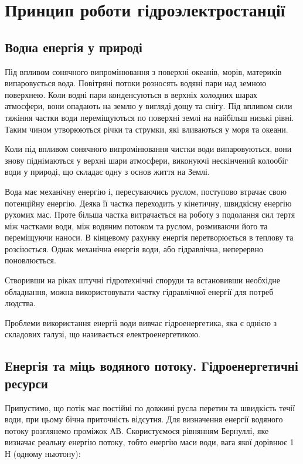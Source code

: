 \documentclass[12pt]{article}
\numberwithin{equation}{section}
\numberwithin{figure}{section}
\begin{document}
\newpage

\section{Принцип роботи гідроэлектростанції}

\subsection{Водна енергія у природі}

Під впливом сонячного випромінювання з поверхні океанів, морів, материків випаровується вода. Повітряні потоки розносять водяні пари над земною поверхнею. Коли водні пари конденсуються в верхніх холодних шарах атмосфери, вони опадають на землю у вигляді дощу та снігу. Під впливом сили тяжіння частки води переміщуються по поверхні землі на найбільш низькі рівні. Таким чином утворюються річки та струмки, які вливаються у моря та океани. 

Коли під впливом сонячного випромінювання чистки води випаровуються, вони знову піднімаються у верхні шари атмосфери, виконуючі нескінчений колообіг води у природі, що складає одну з основ життя на Землі.

Вода  має механічну енергію і, пересуваючись руслом, поступово втрачає свою потенційну енергію. Деяка її частка переходить у кінетичну, швидкісну енергію рухомих мас. Проте більша частка витрачається на роботу з подолання сил тертя між частками води, між водяним потоком та руслом, розмиваючи його та переміщуючи наноси. В кінцевому рахунку енергія перетворюється в теплову та розсіюється. Однак механічна енергія води, або гідравлічна, неперервно поновлюється.

Створивши на ріках штучні гідротехнічні споруди та встановивши необхідне обладнання, можна використовувати частку гідравлічної енергії для потреб людства.

Проблеми використання енергії води вивчає гідроенергетика, яка є однією з складових галузі, що називається електроенергетикою. 

\subsection{Енергія та міць водяного потоку. Гідроенергетичні ресурси}\label{sec:task}

Припустимо, що потік має постійні по довжині русла перетин та швидкість течії води, при цьому бічна приточність відсутня. Для визначення енергії водяного потоку розглянемо проміжок АВ. Скористуємося рівнянням Бернуллі, яке визначає реальну енергію потоку, тобто енергію маси води, вага якої дорівнює 1 Н (одному ньютону): 
\end{document}

